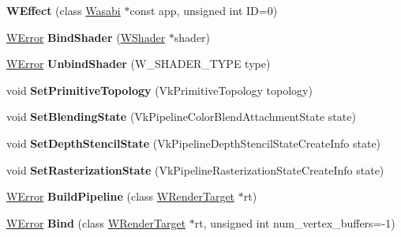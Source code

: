 \begin{DoxyCompactItemize}
\item 
{\bfseries W\+Effect} (class \hyperlink{class_wasabi}{Wasabi} $\ast$const app, unsigned int ID=0)\hypertarget{class_w_effect_addcce5db6fcd74630a19bb8a849aac8b}{}\label{class_w_effect_addcce5db6fcd74630a19bb8a849aac8b}

\item 
\hyperlink{class_w_error}{W\+Error} {\bfseries Bind\+Shader} (\hyperlink{class_w_shader}{W\+Shader} $\ast$shader)\hypertarget{class_w_effect_a8d10167b5c583f2407024c442c1f3b1f}{}\label{class_w_effect_a8d10167b5c583f2407024c442c1f3b1f}

\item 
\hyperlink{class_w_error}{W\+Error} {\bfseries Unbind\+Shader} (W\+\_\+\+S\+H\+A\+D\+E\+R\+\_\+\+T\+Y\+PE type)\hypertarget{class_w_effect_ad176b710ed263f887115fa5221e261ac}{}\label{class_w_effect_ad176b710ed263f887115fa5221e261ac}

\item 
void {\bfseries Set\+Primitive\+Topology} (Vk\+Primitive\+Topology topology)\hypertarget{class_w_effect_a98c52a678d4327226858f15b28a9c0b4}{}\label{class_w_effect_a98c52a678d4327226858f15b28a9c0b4}

\item 
void {\bfseries Set\+Blending\+State} (Vk\+Pipeline\+Color\+Blend\+Attachment\+State state)\hypertarget{class_w_effect_a27b3931516c6099f074bc1fb6d224c59}{}\label{class_w_effect_a27b3931516c6099f074bc1fb6d224c59}

\item 
void {\bfseries Set\+Depth\+Stencil\+State} (Vk\+Pipeline\+Depth\+Stencil\+State\+Create\+Info state)\hypertarget{class_w_effect_ab8c15d5f415d978e21328c3e06b74bdd}{}\label{class_w_effect_ab8c15d5f415d978e21328c3e06b74bdd}

\item 
void {\bfseries Set\+Rasterization\+State} (Vk\+Pipeline\+Rasterization\+State\+Create\+Info state)\hypertarget{class_w_effect_a03de477bc7c26690a39e7750ac36a958}{}\label{class_w_effect_a03de477bc7c26690a39e7750ac36a958}

\item 
\hyperlink{class_w_error}{W\+Error} {\bfseries Build\+Pipeline} (class \hyperlink{class_w_render_target}{W\+Render\+Target} $\ast$rt)\hypertarget{class_w_effect_a3a23db5f72658be47397a877552a78fd}{}\label{class_w_effect_a3a23db5f72658be47397a877552a78fd}

\item 
\hyperlink{class_w_error}{W\+Error} {\bfseries Bind} (class \hyperlink{class_w_render_target}{W\+Render\+Target} $\ast$rt, unsigned int num\+\_\+vertex\+\_\+buffers=-\/1)\hypertarget{class_w_effect_a5a509abbadaeb121acdb0e6dd4ff1ece}{}\label{class_w_effect_a5a509abbadaeb121acdb0e6dd4ff1ece}


\end{DoxyCompactItemize}
